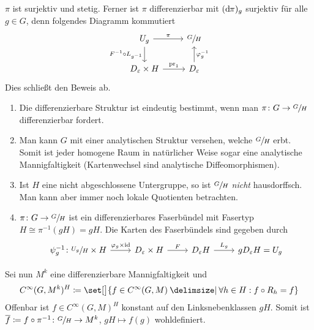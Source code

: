 \begin{beweis}
\begin{enumerate}[(i)]
		$\pi$ ist surjektiv und stetig. Ferner ist $\pi$ differenzierbar mit $(\mathrm{d}\mkern-1.0mu \pi)_g$ surjektiv für alle $g \in G$, denn folgendes Diagramm kommutiert
		\[
			\begin{tikzcd}
				U_g \dar["F^{-1} \circ L_{g^{-1}}"'] \rar["\pi"] & \sfrac{G}{H} \\
				D_\varepsilon \times H \rar["\pr_1"] & D_\varepsilon \uar["\varphi_g^{-1}"']
			\end{tikzcd}
		\]
		Dies schließt den Beweis ab.\qedhere
	\end{enumerate}
\end{beweis}

\begin{bemerkung*}[{name=[differenzierbare Struktur des Quotienten]}]
	\begin{enumerate}[1),itemsep=1pt]
		\item Die differenzierbare Struktur ist eindeutig bestimmt, wenn man $\pi \colon G \to \sfrac{G}{H}$ differenzierbar fordert.
		\item Man kann $G$ mit einer analytischen Struktur versehen, welche $\sfrac{G}{H}$ erbt.
		Somit ist jeder homogene Raum in natürlicher Weise sogar eine analytische Mannigfaltigkeit (Kartenwechsel sind analytische Diffeomorphismen).
		\item Ist $H$ eine nicht abgeschlossene Untergruppe, so ist $\sfrac{G}{H}$ \emph{nicht} hausdorffsch.
		Man kann aber immer noch lokale Quotienten betrachten.
		\item $\pi \colon G \to \sfrac{G}{H}$ ist ein differenzierbares Faserbündel mit Fasertyp $H \cong \pi^{-1}(gH) = gH$.
		Die Karten des Faserbündels sind gegeben durch
		\[
			\begin{tikzcd}
				\psi_g^{-1} \colon \sfrac{U_g}{H} \times H \rar["\varphi_g \times {\id}"] & D_\varepsilon \times H \rar["F"] & D_\varepsilon H \rar["L_g"] & g D_\varepsilon H = U_g
			\end{tikzcd}
		\]
	\end{enumerate}
\end{bemerkung*}

Sei nun $M^k$ eine differenzierbare Mannigfaltigkeit und 
\[
	C^\infty(G,M^k)^H \coloneqq \set[\big]{f \in C^\infty(G,M) \given \forall h \in H : f \circ R_h = f}
\]
Offenbar ist $f \in C^\infty(G,M)^H$ konstant auf den Linksnebenklassen $g H$.
Somit ist $\overline{f} \coloneqq f \circ \pi^{-1} \colon \sfrac{G}{H} \to M^k$, $gH \mapsto f(g)$ wohldefiniert.

